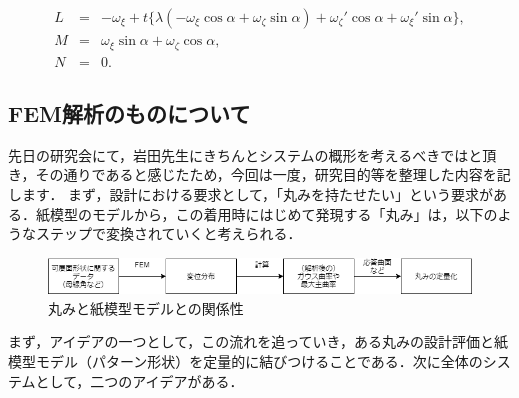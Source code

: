 \documentclass[11pt]{jsarticle}
\begin{document}
			\begin{eqnarray}
				L &=& -\omega_{\xi}+t\{\lambda(-\omega_{\xi}\cos \alpha + \omega_{\zeta}\sin \alpha)+\omega_{\zeta}'\cos \alpha + \omega_{\xi}'\sin \alpha \},  \\
				M &=& \omega_{\xi}\sin \alpha + \omega_{\zeta} \cos \alpha,  \\
				N &=& 0. 
			\end{eqnarray}
			
		\subsection{FEM解析のものについて}
			先日の研究会にて，岩田先生にきちんとシステムの概形を考えるべきではと頂き，その通りであると感じたため，今回は一度，研究目的等を整理した内容を記します．
			まず，設計における要求として，「丸みを持たせたい」という要求がある．紙模型のモデルから，この着用時にはじめて発現する「丸み」は，以下のようなステップで変換されていくと考えられる．
			\begin{figure}[h!]
				\centering
				\includegraphics[scale=0.5]{./figure/round.png}
				\caption{丸みと紙模型モデルとの関係性}
			\end{figure}
			まず，アイデアの一つとして，この流れを追っていき，ある丸みの設計評価と紙模型モデル（パターン形状）を定量的に結びつけることである．次に全体のシステムとして，二つのアイデアがある．
			
\end{document}
